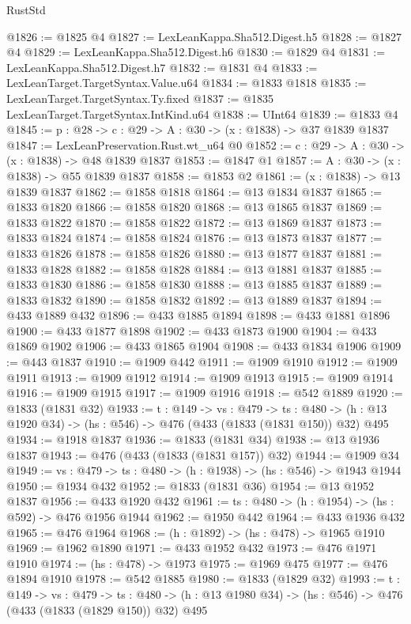 \begin{lexlean}{RustStd}
\begin{coremodule}
@1826 := @1825 @4
@1827 := LexLeanKappa.Sha512.Digest.h5
@1828 := @1827 @4
@1829 := LexLeanKappa.Sha512.Digest.h6
@1830 := @1829 @4
@1831 := LexLeanKappa.Sha512.Digest.h7
@1832 := @1831 @4
@1833 := LexLeanTarget.TargetSyntax.Value.u64
@1834 := @1833 @1818
@1835 := LexLeanTarget.TargetSyntax.Ty.fixed
@1837 := @1835 LexLeanTarget.TargetSyntax.IntKind.u64
@1838 := UInt64
@1839 := @1833 @4
@1845 := {p : @28} -> {c : @29} -> {A : @30} -> (x : @1838) -> @37 @1839 @1837
@1847 := LexLeanPreservation.Rust.wt_u64 @0
@1852 := {c : @29} -> {A : @30} -> (x : @1838) -> @48 @1839 @1837
@1853 := @1847 @1
@1857 := {A : @30} -> (x : @1838) -> @55 @1839 @1837
@1858 := @1853 @2
@1861 := (x : @1838) -> @13 @1839 @1837
@1862 := @1858 @1818
@1864 := @13 @1834 @1837
@1865 := @1833 @1820
@1866 := @1858 @1820
@1868 := @13 @1865 @1837
@1869 := @1833 @1822
@1870 := @1858 @1822
@1872 := @13 @1869 @1837
@1873 := @1833 @1824
@1874 := @1858 @1824
@1876 := @13 @1873 @1837
@1877 := @1833 @1826
@1878 := @1858 @1826
@1880 := @13 @1877 @1837
@1881 := @1833 @1828
@1882 := @1858 @1828
@1884 := @13 @1881 @1837
@1885 := @1833 @1830
@1886 := @1858 @1830
@1888 := @13 @1885 @1837
@1889 := @1833 @1832
@1890 := @1858 @1832
@1892 := @13 @1889 @1837
@1894 := @433 @1889 @432
@1896 := @433 @1885 @1894
@1898 := @433 @1881 @1896
@1900 := @433 @1877 @1898
@1902 := @433 @1873 @1900
@1904 := @433 @1869 @1902
@1906 := @433 @1865 @1904
@1908 := @433 @1834 @1906
@1909 := @443 @1837
@1910 := @1909 @442
@1911 := @1909 @1910
@1912 := @1909 @1911
@1913 := @1909 @1912
@1914 := @1909 @1913
@1915 := @1909 @1914
@1916 := @1909 @1915
@1917 := @1909 @1916
@1918 := @542 @1889
@1920 := @1833 (@1831 @32)
@1933 := {t : @149} ->
  {vs : @479} ->
  {ts : @480} -> (h : @13 @1920 @34) -> (hs : @546) -> @476 (@433 (@1833 (@1831 @150)) @32) @495
@1934 := @1918 @1837
@1936 := @1833 (@1831 @34)
@1938 := @13 @1936 @1837
@1943 := @476 (@433 (@1833 (@1831 @157)) @32)
@1944 := @1909 @34
@1949 := {vs : @479} -> {ts : @480} -> (h : @1938) -> (hs : @546) -> @1943 @1944
@1950 := @1934 @432
@1952 := @1833 (@1831 @36)
@1954 := @13 @1952 @1837
@1956 := @433 @1920 @432
@1961 := {ts : @480} -> (h : @1954) -> (hs : @592) -> @476 @1956 @1944
@1962 := @1950 @442
@1964 := @433 @1936 @432
@1965 := @476 @1964
@1968 := (h : @1892) -> (hs : @478) -> @1965 @1910
@1969 := @1962 @1890
@1971 := @433 @1952 @432
@1973 := @476 @1971 @1910
@1974 := (hs : @478) -> @1973
@1975 := @1969 @475
@1977 := @476 @1894 @1910
@1978 := @542 @1885
@1980 := @1833 (@1829 @32)
@1993 := {t : @149} ->
  {vs : @479} ->
  {ts : @480} -> (h : @13 @1980 @34) -> (hs : @546) -> @476 (@433 (@1833 (@1829 @150)) @32) @495

\end{coremodule}
\end{lexlean}
